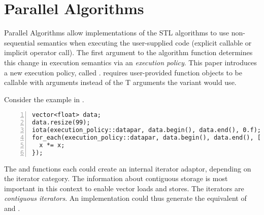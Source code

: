 \section{Parallel Algorithms}

Parallel Algorithms allow implementations of the STL algorithms to use non-sequential semantics when executing the user-supplied code (explicit callable or implicit operator call).
The first argument to the algorithm function determines this change in execution semantics via an \emph{execution policy}.
This paper introduces a new execution policy, called \dataparEP.
\dataparEP requires user-provided function objects to be callable with \datapar[<T, Abi>] arguments instead of the \type T arguments the \seqEP variant would use.

Consider the example in .
\begin{lstlisting}[style=Vc,numbers=left,float,label=lst:datapar foreach,caption={
  Small example using \dataparEP with \code{iota} and \code{for_each}.
}]
vector<float> data;
data.resize(99);
iota(execution_policy::datapar, data.begin(), data.end(), 0.f);
for_each(execution_policy::datapar, data.begin(), data.end(), [](auto &x) {
  x *= x;
});
\end{lstlisting}
The  and  functions each could create an internal \datapar iterator adaptor, depending on the iterator category.
The information about contiguous storage is most important in this context to enable vector loads and stores.
The  iterators are \emph{contiguous iterators}.
An implementation could thus generate the equivalent of  and .


